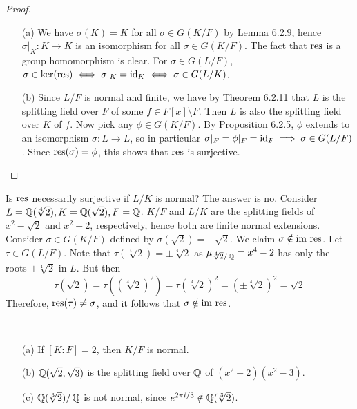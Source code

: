 \documentclass[11pt]{book}
\theoremstyle{definition}   \newtheorem{defn}[counter]{Definition} %
\newcommand{\bs}{\setminus}   \newcommand{\A}{\mathcal{A}}   \newcommand{\sy}{\textnormal{Syl}}   \newcommand{\size}[1]{\left| #1 \right|}
\DeclareMathOperator{\ra}{\rightarrow}   \DeclareMathOperator{\Poly}{\mathbf{P}}   \DeclareMathOperator{\spn}{\textnormal{span}}   \DeclareMathOperator{\aut}{\textnormal{Aut}}
\newcommand{\vs}{\vspace{8pt}}   \newcommand{\hs}{\hspace{8pt}}
\numberwithin{counter}{chapter}
\begin{document}
\begin{proof}\ 
\begin{enumerate}
\item[(a)] We have $\sigma(K) = K$ for all $\sigma \in G(K/F)$ by Lemma 6.2.9, hence $\sigma|_K : K \ra K$ is an isomorphism for all $\sigma \in G(K/F)$. The fact that $\textnormal{res}$ is a group homomorphism is clear. For $\sigma \in G(L/F)$, $\sigma \in \ker(\textnormal{res}) \iff \sigma|_K = \textnormal{id}_K \iff \sigma \in G(L/K)$.  

\item[(b)] Since $L/F$ is normal and finite, we have by Theorem 6.2.11 that $L$ is the splitting field over $F$ of some $f \in F[x] \bs F$. Then $L$ is also the splitting field over $K$ of $f$. Now pick any $\phi \in G(K/F)$. By Proposition 6.2.5, $\phi$ extends to an isomorphism $\sigma : L \ra L$, so in particular $\sigma|_F = \phi|_F = \textnormal{id}_F \implies \sigma \in G(L/F)$. Since $\textnormal{res}(\sigma) = \phi$, this shows that $\textnormal{res}$ is surjective. 
\end{enumerate}
\end{proof}

\vs

\begin{remark*}
Is $\textnormal{res}$ necessarily surjective if $L/K$ is normal? The answer is no. Consider $L = \operatorname{\mathbb{Q}}(\sqrt[4]{2}), K = \operatorname{\mathbb{Q}}(\sqrt{2}), F = \operatorname{\mathbb{Q}}$. $K/F$ and $L/K$ are the splitting fields of $x^2-\sqrt{2}$ and $x^2-2$, respectively, hence both are finite normal extensions. Consider $\sigma \in G(K/F)$ defined by $\sigma(\sqrt{2}) = -\sqrt{2}$. We claim $\sigma \notin \textnormal{im } \textnormal{res}$. Let $\tau \in G(L/F)$. Note that $\tau(\sqrt[4]{2}) = \pm \sqrt[4]{2}$ as $\mu_{\sqrt[4]{2}/\operatorname{\mathbb{Q}}} = x^4-2$ has only the roots $\pm \sqrt[4]{2}$ in $L$. But then
	\[\tau(\sqrt{2}) = \tau((\sqrt[4]{2})^2) = \tau(\sqrt[4]{2})^2 = (\pm \sqrt[4]{2})^2 = \sqrt{2} \]
Therefore, $\textnormal{res}(\tau) \ne \sigma$, and it follows that $\sigma \notin \textnormal{im } \textnormal{res}$. 
\end{remark*}

\vs

\begin{example}\ 
\begin{enumerate}
\item[(a)] If $[K : F] = 2$, then $K/F$ is normal. 
\item[(b)] $\operatorname{\mathbb{Q}}(\sqrt{2},\sqrt{3})$ is the splitting field over $\operatorname{\mathbb{Q}}$ of $(x^2-2)(x^2-3)$. 
\item[(c)] $\operatorname{\mathbb{Q}}(\sqrt[3]{2})/\operatorname{\mathbb{Q}}$ is not normal, since $e^{2 \pi i/3} \notin \operatorname{\mathbb{Q}}(\sqrt[3]{2})$. 
\end{enumerate}
\end{example}
\end{document}
